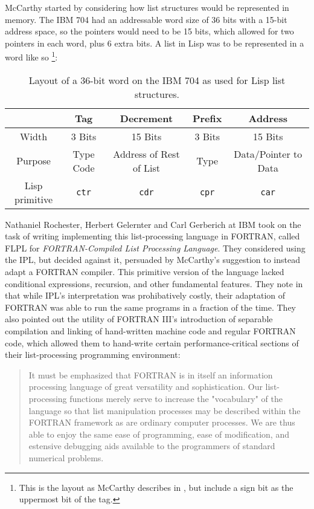 McCarthy started by considering how list structures would be represented in
memory. The IBM 704 had an addressable word size of 36 bits with
a 15-bit address space, so the pointers would need to be 15 bits,
which allowed for two pointers in each word, plus 6 extra bits.
A list in Lisp was to be represented in a word like so
\footnote{This is the layout as McCarthy describes in ,
	but \citeauthor{gelernter_flpl_1960} include a sign bit as the uppermost bit of the tag.}:

\begin{table}[h]
	\centering
	\begin{tabular}{|c|c|c|c|c|}
		\hline
		               & \textbf{Tag} & \textbf{Decrement}      & \textbf{Prefix} & \textbf{Address}     \\
		\hline
		Width          & 3 Bits       & 15 Bits                 & 3 Bits          & 15 Bits              \\
		\hline
		Purpose        & Type Code    & Address of Rest of List & Type            & Data/Pointer to Data \\
		\hline
		Lisp primitive & \texttt{ctr} & \texttt{cdr}            & \texttt{cpr}    & \texttt{car}         \\
		\hline
	\end{tabular}
	\caption{Layout of a 36-bit word on the IBM 704 as used for Lisp list structures.}
\end{table}

Nathaniel Rochester, Herbert Gelernter and Carl Gerberich at IBM
took on the task of writing implementing this list-processing language
in FORTRAN, called FLPL for \textit{FORTRAN-Compiled List Processing Language}.
They considered using the IPL, but decided against it, persuaded by McCarthy's suggestion
to instead adapt a FORTRAN compiler.
This primitive version of the language lacked conditional expressions, recursion, and other
fundamental features.
They note in  that while IPL's interpretation was prohibatively
costly, their adaptation of FORTRAN was able to run the same programs in a fraction of the time.
They also pointed out the utility of FORTRAN III's introduction of separable compilation and linking of
hand-written machine code and regular FORTRAN code, which allowed them to hand-write certain
performance-critical sections of their list-processing programming environment\cite{gelernter_flpl_1960}:

\begin{quotation}
	It must be emphasized that
	FORTRAN is in itself an information processing language of great versatility and
	sophistication. Our list-processing functions merely serve to increase the "vocabulary"
	of the language so that list manipulation processes may be described within
	the FORTRAN framework as are ordinary computer processes. We are thus able
	to enjoy the same ease of programming, ease of modification, and estensive debugging
	aids available to the programmers of standard numerical problems.
\end{quotation}

